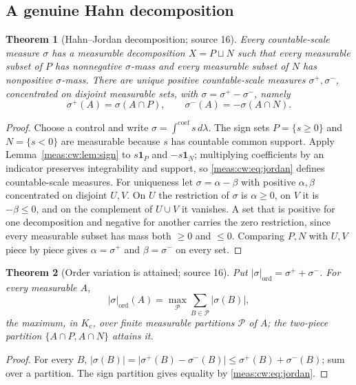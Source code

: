 \documentclass[11pt]{article}
\numberwithin{equation}{section}
\newtheorem{theorem}{Theorem}[section]
\theoremstyle{definition}
\theoremstyle{remark}
\newcommand{\ind}{\mathbf 1}
\newcommand{\abs}[1]{\lvert#1\rvert}
\newcommand{\Kc}{K_{\mathrm c}}
\newcommand{\intc}{\mathop{\int}\nolimits^{\mathrm{coef}}}
\begin{document}
\subsection{A genuine Hahn decomposition}

\begin{theorem}[Hahn--Jordan decomposition; source 16]\label{meas:cw:thm:jordan}
Every countable-scale measure $\sigma$ has a measurable decomposition
$X=P\sqcup N$ such that every measurable subset of $P$ has nonnegative
$\sigma$-mass and every measurable subset of $N$ has nonpositive $\sigma$-mass.
There are unique positive countable-scale measures $\sigma^+,\sigma^-$,
concentrated on disjoint measurable sets, with $\sigma=\sigma^+-\sigma^-$, namely
\begin{equation}\label{meas:cw:eq:jordan}
 \sigma^+(A)=\sigma(A\cap P),\qquad\sigma^-(A)=-\sigma(A\cap N).
\end{equation}
\end{theorem}
\begin{proof}
Choose a control and write $\sigma=\intc s\,d\lambda$. The sign sets
$P=\{s\ge0\}$ and $N=\{s<0\}$ are measurable because $s$ has countable common
support. Apply Lemma~\ref{meas:cw:lem:sign} to $s\ind_P$ and $-s\ind_N$;
multiplying coefficients by an indicator preserves integrability and support,
so \eqref{meas:cw:eq:jordan} defines countable-scale measures. For uniqueness let
$\sigma=\alpha-\beta$ with positive $\alpha,\beta$ concentrated on disjoint $U,V$. On
$U$ the restriction of $\sigma$ is $\alpha\ge0$, on $V$ it is $-\beta\le0$, and on
the complement of $U\cup V$ it vanishes. A set that is positive for one
decomposition and negative for another carries the zero restriction, since
every measurable subset has mass both $\ge0$ and $\le0$. Comparing $P,N$ with
$U,V$ piece by piece gives $\alpha=\sigma^+$ and $\beta=\sigma^-$ on every set.
\end{proof}

\begin{theorem}[Order variation is attained; source 16]\label{meas:cw:thm:variation}
Put $\abs\sigma_{\mathrm{ord}}=\sigma^++\sigma^-$. For every measurable $A$,
\begin{equation}\label{meas:cw:eq:variation}
 \abs\sigma_{\mathrm{ord}}(A)=\max_{\mathcal P}\sum_{B\in\mathcal P}\abs{\sigma(B)},
\end{equation}
the maximum, in $\Kc$, over finite measurable partitions $\mathcal P$ of $A$; the
two-piece partition $\{A\cap P,A\cap N\}$ attains it.
\end{theorem}
\begin{proof}
For every $B$,
$\abs{\sigma(B)}=\abs{\sigma^+(B)-\sigma^-(B)}\le\sigma^+(B)+\sigma^-(B)$; sum over a
partition. The sign partition gives equality by \eqref{meas:cw:eq:jordan}.
\end{proof}
\end{document}
